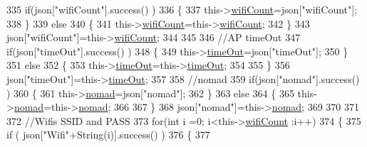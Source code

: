 \begin{DoxyCode}
335             \textcolor{keywordflow}{if}(json[\textcolor{stringliteral}{"wifiCount"}].success() )
336             \{           
337                 this->\hyperlink{class_cool_wifi_ab133bd92fcb895b884deecd6678592e4}{wifiCount}=json[\textcolor{stringliteral}{"wifiCount"}];
338             \}
339             \textcolor{keywordflow}{else}
340             \{
341                 this->\hyperlink{class_cool_wifi_ab133bd92fcb895b884deecd6678592e4}{wifiCount}=this->\hyperlink{class_cool_wifi_ab133bd92fcb895b884deecd6678592e4}{wifiCount};
342             \}
343             json[\textcolor{stringliteral}{"wifiCount"}]=this->\hyperlink{class_cool_wifi_ab133bd92fcb895b884deecd6678592e4}{wifiCount};
344 
345             
346             \textcolor{comment}{//AP timeOut}
347             \textcolor{keywordflow}{if}(json[\textcolor{stringliteral}{"timeOut"}].success() )
348             \{
349                 this->\hyperlink{class_cool_wifi_a952111605f25156588b5632caaba1c6f}{timeOut}=json[\textcolor{stringliteral}{"timeOut"}];
350             \}
351             \textcolor{keywordflow}{else}
352             \{
353                 this->\hyperlink{class_cool_wifi_a952111605f25156588b5632caaba1c6f}{timeOut}=this->\hyperlink{class_cool_wifi_a952111605f25156588b5632caaba1c6f}{timeOut};
354 
355             \}
356             json[\textcolor{stringliteral}{"timeOut"}]=this->\hyperlink{class_cool_wifi_a952111605f25156588b5632caaba1c6f}{timeOut};
357 
358             \textcolor{comment}{//nomad}
359             \textcolor{keywordflow}{if}(json[\textcolor{stringliteral}{"nomad"}].success() )
360             \{
361                 this->\hyperlink{class_cool_wifi_ab7d9643c4af7bac3be331ef008b2ea27}{nomad}=json[\textcolor{stringliteral}{"nomad"}];
362             \}
363             \textcolor{keywordflow}{else}
364             \{
365                 this->\hyperlink{class_cool_wifi_ab7d9643c4af7bac3be331ef008b2ea27}{nomad}=this->\hyperlink{class_cool_wifi_ab7d9643c4af7bac3be331ef008b2ea27}{nomad};
366 
367             \}
368             json[\textcolor{stringliteral}{"nomad"}]=this->\hyperlink{class_cool_wifi_ab7d9643c4af7bac3be331ef008b2ea27}{nomad};
369 
370             
371             
372             \textcolor{comment}{//Wifis SSID and PASS}
373             \textcolor{keywordflow}{for}(\textcolor{keywordtype}{int} i =0; i<this->\hyperlink{class_cool_wifi_ab133bd92fcb895b884deecd6678592e4}{wifiCount} ;i++)
374             \{
375                 \textcolor{keywordflow}{if} ( json[\textcolor{stringliteral}{"Wifi"}+String(i)].success() )
376                 \{
377                     

\end{DoxyCode}
